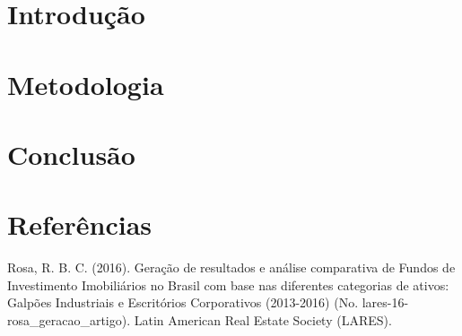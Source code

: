 \documentclass[
	12pt,				%
	openany,			%
  oneside,      %
	a4paper,			%
	english,			%
	french,				%
	spanish,			%
	brazil				%
	]{abntex2}
\begin{document}
\chapter[Introdução]{Introdução}



%

\chapter{Metodologia}


\chapter{Conclusão}




\postextual

%
\chapter*{Referências}

\noindent Rosa, R. B. C. (2016). Geração de resultados e análise comparativa de Fundos de Investimento Imobiliários no Brasil com base nas diferentes categorias de ativos: Galpões Industriais e Escritórios Corporativos (2013-2016) (No. lares-16-rosa\_geracao\_artigo). Latin American Real Estate Society (LARES).
\end{document}
